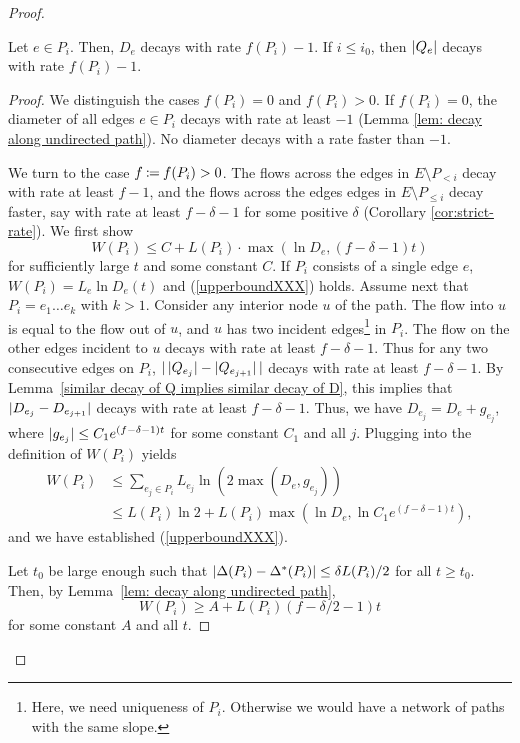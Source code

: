 \documentclass[11pt,a4paper]{article}
\begin{document}
\begin{proof}
\begin{lemma}\label{lem:exact-rate}
 Let $e \in P_i$. Then, $D_e$ decays with
rate $f(P_i) - 1$. If $i \le i_0$, then $| Q_e |$ decays with rate $f(P_i) -1$. \end{lemma}
\begin{proof} We distinguish the cases $f(P_i) = 0$ and $f(P_i) > 0$. 
If $f(P_i) = 0$, the diameter of all edges $e \in P_i$ decays with rate at
least $-1$ (Lemma \ref{lem: decay along undirected path}). No diameter decays
with a rate faster than $-1$. 

We turn to the case $f \assign f(P_i) > 0$. The flows across the edges 
in $E \setminus P_{< i}$ decay with 
rate at least $f - 1$, and the flows across the edges 
edges in $E \setminus P_{\le i}$ decay faster, say
with rate at least $f - \delta - 1$ for some positive $\delta$ (Corollary \ref{cor:strict-rate}). We first show
\begin{equation} \label{upperboundXXX}
                  W(P_i) \le C + L(P_i) \cdot \max(\ln D_e, (f - \delta - 1)t) 
\end{equation}
for sufficiently large $t$ and some constant $C$. 
If $P_i$ consists of a single edge $e$, $W(P_i) = L_e \ln D_e(t)$ and
(\ref{upperboundXXX}) holds. Assume next that $P_i = e_1 \ldots e_k$ with $k > 1$. 
Consider any interior node $u$ of the path. The flow into $u$ is equal to the
flow out of $u$, and $u$ has two incident edges\footnote{Here, we need
uniqueness of $P_i$. Otherwise we would have a network of paths with the same slope.}
in $P_i$. The flow on
the other edges incident to $u$ decays with rate at least $f - \delta - 1$. Thus
for any two consecutive edges on $P_i$, $| \, | Q_{e_j} | -
| Q_{e_{j+1}} |\,  |$ decays with rate at least $f - \delta - 1$. By
Lemma~\ref{similar decay of Q implies similar decay of D}, this implies that 
$| D_{e_j} - D_{e_{j+1}} |$ decays with rate at least $f - \delta - 1$. 
Thus, we have 
$D_{e_j} = D_{e} + g_{e_j}$, where $| g_{e_j} | \le C_1 e^{(f - \delta - 1)t}$
for some constant $C_1$ and all $j$. Plugging into the definition of
$W(P_i)$ yields
\begin{align*}
 W(P_i) & \le \sum_{e_j \in P_i} L_{e_j} \ln \left(2 \max(D_{e},g_{e_j})\right) \\
        & \le L(P_i) \ln 2 + L(P_i) \max( \ln D_{e}, \ln C_1 e^{(f - \delta - 1)t}),
\end{align*}
and we have established (\ref{upperboundXXX}). 

Let $t_0$ be large enough such that $| \Delta(P_i) - \Delta^*(P_i) | \le
\delta L(P_i)/2$ for all $t \ge t_0$. Then, by Lemma~\ref{lem: decay along
undirected path}, 
\begin{equation} W(P_i) \ge A  + L(P_i) (f  - \delta/2 - 1) t
\label{eq: lower bound} \end{equation}
for some constant $A$ and all $t$. 


\end{proof}
\end{proof}
\end{document}
